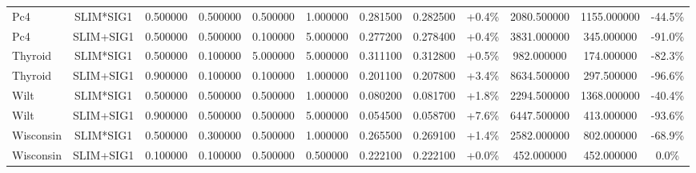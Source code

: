 \begin{table}[H]
\begin{tabular}{lccccccccccc}
Pc4 & SLIM*SIG1 & 0.500000 & 0.500000 & 0.500000 & 1.000000 & 0.281500 & 0.282500 & +0.4\% & 2080.500000 & 1155.000000 & -44.5\% \\
Pc4 & SLIM+SIG1 & 0.500000 & 0.500000 & 0.100000 & 5.000000 & 0.277200 & 0.278400 & +0.4\% & 3831.000000 & 345.000000 & -91.0\% \\
Thyroid & SLIM*SIG1 & 0.500000 & 0.100000 & 5.000000 & 5.000000 & 0.311100 & 0.312800 & +0.5\% & 982.000000 & 174.000000 & -82.3\% \\
Thyroid & SLIM+SIG1 & 0.900000 & 0.100000 & 0.100000 & 1.000000 & 0.201100 & 0.207800 & +3.4\% & 8634.500000 & 297.500000 & -96.6\% \\
Wilt & SLIM*SIG1 & 0.500000 & 0.500000 & 0.500000 & 1.000000 & 0.080200 & 0.081700 & +1.8\% & 2294.500000 & 1368.000000 & -40.4\% \\
Wilt & SLIM+SIG1 & 0.900000 & 0.500000 & 0.500000 & 5.000000 & 0.054500 & 0.058700 & +7.6\% & 6447.500000 & 413.000000 & -93.6\% \\
Wisconsin & SLIM*SIG1 & 0.500000 & 0.300000 & 0.500000 & 1.000000 & 0.265500 & 0.269100 & +1.4\% & 2582.000000 & 802.000000 & -68.9\% \\
Wisconsin & SLIM+SIG1 & 0.100000 & 0.100000 & 0.500000 & 0.500000 & 0.222100 & 0.222100 & +0.0\% & 452.000000 & 452.000000 & 0.0\% \\
\bottomrule
\end{tabular}

        
    \end{table}
    